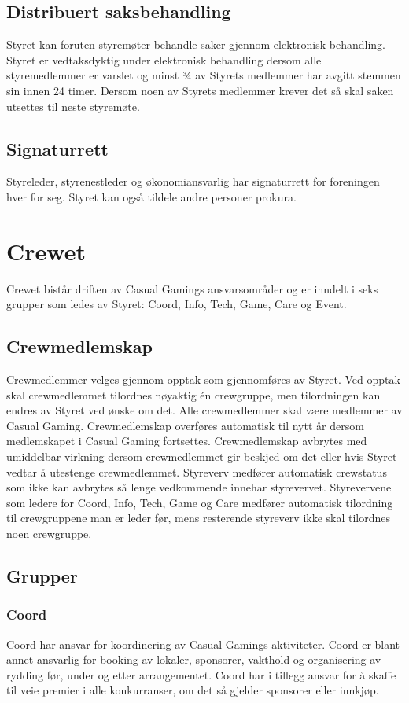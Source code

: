 \subsection{Distribuert saksbehandling}
Styret kan foruten styremøter behandle saker gjennom elektronisk behandling. Styret er vedtaksdyktig under elektronisk behandling dersom alle styremedlemmer er varslet og minst ¾ av Styrets medlemmer har avgitt stemmen sin innen 24 timer. Dersom noen av Styrets medlemmer krever det så skal saken utsettes til neste styremøte.

\subsection{Signaturrett}
Styreleder, styrenestleder og økonomiansvarlig har signaturrett for foreningen hver for seg. Styret kan også tildele andre personer prokura.

\section{Crewet}
Crewet bistår driften av Casual Gamings ansvarsområder og er inndelt i seks grupper som ledes av Styret: Coord, Info, Tech, Game, Care og Event.

\subsection{Crewmedlemskap}
Crewmedlemmer velges gjennom opptak som gjennomføres av Styret. Ved opptak skal crewmedlemmet tilordnes nøyaktig én crewgruppe, men tilordningen kan endres av Styret ved ønske om det. Alle crewmedlemmer skal være medlemmer av Casual Gaming. Crewmedlemskap overføres automatisk til nytt år dersom medlemskapet i Casual Gaming fortsettes. Crewmedlemskap avbrytes med umiddelbar virkning dersom crewmedlemmet gir beskjed om det eller hvis Styret vedtar å utestenge crewmedlemmet. Styreverv medfører automatisk crewstatus som ikke kan avbrytes så lenge vedkommende innehar styrevervet. Styrevervene som ledere for Coord, Info, Tech, Game og Care medfører automatisk tilordning til crewgruppene man er leder før, mens resterende styreverv ikke skal tilordnes noen crewgruppe.

\subsection{Grupper}

\subsubsection{Coord}
Coord har ansvar for koordinering av Casual Gamings aktiviteter. Coord er blant annet ansvarlig for booking av lokaler, sponsorer, vakthold og organisering av rydding før, under og etter arrangementet. Coord har i tillegg ansvar for å skaffe til veie premier i alle konkurranser, om det så gjelder sponsorer eller innkjøp.

